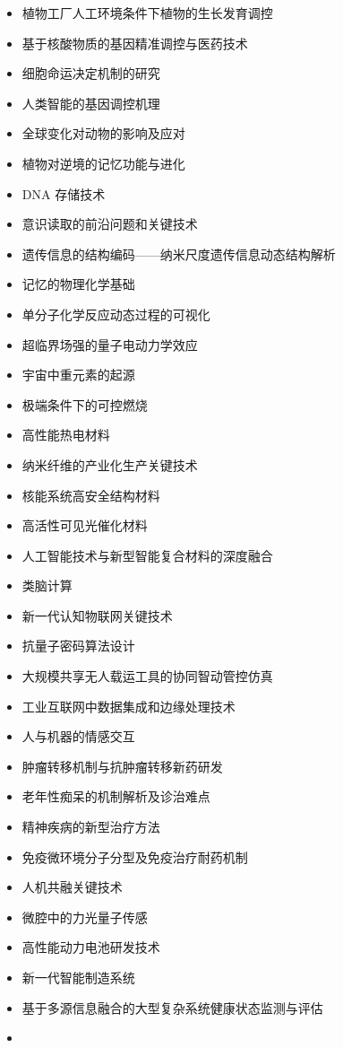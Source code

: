 \documentclass[]{tufte-book}
\begin{document}
\begin{itemize}
\item
  植物工厂人工环境条件下植物的生长发育调控
\item
  基于核酸物质的基因精准调控与医药技术
\item
  细胞命运决定机制的研究
\item
  人类智能的基因调控机理
\item
  全球变化对动物的影响及应对
\item
  植物对逆境的记忆功能与进化
\item
  DNA 存储技术
\item
  意识读取的前沿问题和关键技术
\item
  遗传信息的结构编码------纳米尺度遗传信息动态结构解析
\item
  记忆的物理化学基础
\item
  单分子化学反应动态过程的可视化
\item
  超临界场强的量子电动力学效应
\item
  宇宙中重元素的起源
\item
  极端条件下的可控燃烧
\item
  高性能热电材料
\item
  纳米纤维的产业化生产关键技术
\item
  核能系统高安全结构材料
\item
  高活性可见光催化材料
\item
  人工智能技术与新型智能复合材料的深度融合
\item
  类脑计算
\item
  新一代认知物联网关键技术
\item
  抗量子密码算法设计
\item
  大规模共享无人载运工具的协同智动管控仿真
\item
  工业互联网中数据集成和边缘处理技术
\item
  人与机器的情感交互
\item
  肿瘤转移机制与抗肿瘤转移新药研发
\item
  老年性痴呆的机制解析及诊治难点
\item
  精神疾病的新型治疗方法
\item
  免疫微环境分子分型及免疫治疗耐药机制
\item
  人机共融关键技术
\item
  微腔中的力光量子传感
\item
  高性能动力电池研发技术
\item
  新一代智能制造系统
\item
  基于多源信息融合的大型复杂系统健康状态监测与评估
\item

\end{itemize}
\end{document}
